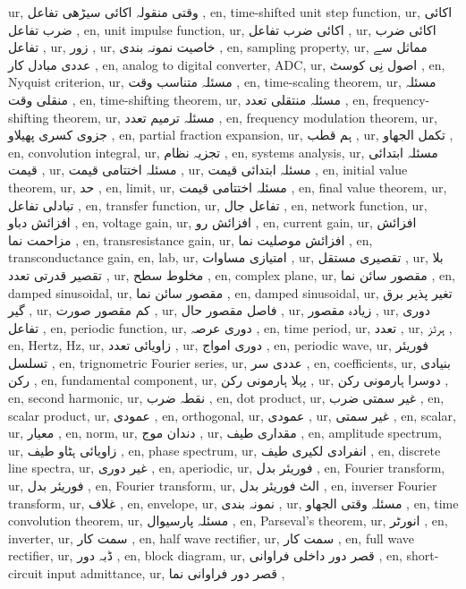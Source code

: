 ur, وقتی منقولہ اکائی سیڑھی تفاعل ,
en, time-shifted unit step function,
ur, اکائی ضرب تفاعل ,
en, unit impulse function,
ur, اکائی ضرب تفاعل ,
ur, اکائی ضرب تفاعل ,
ur, زور ,
ur, خاصیت نمونہ بندی ,
en, sampling property,
ur, مماثل سے عددی مبادل کار ,
en, analog to digital converter, ADC,
ur, اصول نِی کوسٹ ,
en, Nyquist criterion,
ur, مسئلہ متناسب وقت ,
en, time-scaling theorem,
ur, مسئلہ منقلی وقت ,
en, time-shifting theorem,
ur, مسئلہ منتقلی تعدد ,
en, frequency-shifting theorem,
ur, مسئلہ ترمیم تعدد ,
en, frequency modulation theorem,
ur, جزوی کسری پھیلاو ,
en, partial fraction expansion,
ur, ہم قطب ,
ur, تکمل الجھاو ,
en, convolution integral,
ur, تجزیہ نظام ,
en, systems analysis,
ur, مسئلہ ابتدائی قیمت ,
ur, مسئلہ اختتامی قیمت ,
ur, مسئلہ ابتدائی قیمت ,
en, initial value theorem,
ur, حد ,
en, limit,
ur, مسئلہ اختتامی قیمت ,
en, final value theorem,
ur, تبادلی تفاعل ,
en, transfer function,
ur, تفاعل جال ,
en, network function,
ur, افزائش دباو ,
en, voltage gain,
ur, افزائش رو ,
en, current gain,
ur, افزائش مزاحمت نما ,
en, transresistance gain,
ur, افزائش موصلیت نما ,
en, transconductance gain,
en, lab,
ur, امتیازی مساوات ,
ur, تقصیری مستقل ,
ur, بلا تقصیر قدرتی تعدد ,
ur, مخلوط سطح ,
en, complex plane,
ur, مقصور سائن نما ,
en, damped sinusoidal,
ur, مقصور سائن نما ,
en, damped sinusoidal,
ur, تغیر پذیر برق گیر ,
ur, کم مقصور صورت ,
ur, فاصل مقصور حال ,
ur, زیادہ مقصور ,
ur, دوری تفاعل ,
en, periodic function,
ur, دوری عرصہ ,
en, time period,
ur, تعدد ,
ur, ہرٹز ,
en, Hertz, \si {\hertz },
ur, زاویائی تعدد ,
ur, دوری امواج ,
en, periodic wave,
ur, فوریئر تسلسل ,
en, trignometric Fourier series,
ur, عددی سر ,
en, coefficients,
ur, بنیادی رکن ,
en, fundamental component,
ur, پہلا ہارمونی رکن ,
ur, دوسرا ہارمونی رکن ,
en, second harmonic,
ur, نقطہ ضرب ,
en, dot product,
ur, غیر سمتی ضرب ,
en, scalar product,
ur, عمودی ,
en, orthogonal,
ur, عمودی ,
ur, غیر سمتی ,
en, scalar,
ur, معیار ,
en, norm,
ur, دندان موج ,
ur, مقداری طیف ,
en, amplitude spectrum,
ur, زاویائی ہٹاو طیف ,
en, phase spectrum,
ur, انفرادی لکیری طیف ,
en, discrete line spectra,
ur, غیر دوری ,
en, aperiodic,
ur, فوریئر بدل ,
en, Fourier transform,
ur, فوریئر بدل ,
en, Fourier transform,
ur, الٹ فوریئر بدل ,
en, inverser Fourier transform,
ur, غلاف ,
en, envelope,
ur, نمونہ بندی ,
ur, مسئلہ وقتی الجھاو ,
en, time convolution theorem,
ur, مسئلہ پارسیوال ,
en, Parseval's theorem,
ur, انورٹر ,
en, inverter,
ur, سمت کار ,
en, half wave rectifier,
ur, سمت کار ,
en, full wave rectifier,
ur, ڈبہ دور ,
en, block diagram,
ur, قصر دور داخلی فراوانی ,
en, short-circuit input admittance,
ur, قصر دور فراوانی نما ,
